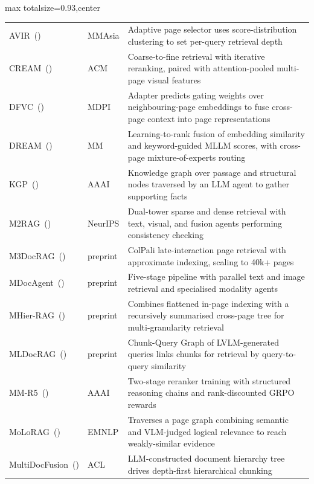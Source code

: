 \begin{table}[p]
\begin{adjustbox}{max totalsize={\textwidth}{0.93\textheight},center}
\begin{tabular}{@{}l l >{\raggedright\arraybackslash}p{}@{}}
\rowcolor{sectionbg}
\multicolumn{3}{l}{\textbf{Retrieval-Augmented Pipelines}} \\
\midrule
  {AVIR}~(\citeyear{li2026avir}) & MMAsia & Adaptive page selector uses score-distribution clustering to set per-query retrieval depth \\
  {CREAM}~(\citeyear{zhang2024cream}) & ACM & Coarse-to-fine retrieval with iterative reranking, paired with attention-pooled multi-page visual features \\
  {DFVC}~(\citeyear{qian2026accurate}) & MDPI & Adapter predicts gating weights over neighbouring-page embeddings to fuse cross-page context into page representations \\
  {DREAM}~(\citeyear{zhang2025dream}) & MM & Learning-to-rank fusion of embedding similarity and keyword-guided MLLM scores, with cross-page mixture-of-experts routing \\
  {KGP}~(\citeyear{wang2024knowledge}) & AAAI & Knowledge graph over passage and structural nodes traversed by an LLM agent to gather supporting facts \\
  {M2RAG}~(\citeyear{duan2025m2rag}) & NeurIPS & Dual-tower sparse and dense retrieval with text, visual, and fusion agents performing consistency checking \\
  {M3DocRAG}~(\citeyear{cho2024m3docrag}) & preprint & ColPali late-interaction page retrieval with approximate indexing, scaling to 40k+ pages \\
  {MDocAgent}~(\citeyear{han2025mdocagent}) & preprint & Five-stage pipeline with parallel text and image retrieval and specialised modality agents \\
  {MHier-RAG}~(\citeyear{gong2026mhier}) & preprint & Combines flattened in-page indexing with a recursively summarised cross-page tree for multi-granularity retrieval \\
  {MLDocRAG}~(\citeyear{zhang2026mldocrag}) & preprint & Chunk-Query Graph of LVLM-generated queries links chunks for retrieval by query-to-query similarity \\
  {MM-R5}~(\citeyear{xu2025mm}) & AAAI & Two-stage reranker training with structured reasoning chains and rank-discounted GRPO rewards \\
  {MoLoRAG}~(\citeyear{wu2025molorag}) & EMNLP & Traverses a page graph combining semantic and VLM-judged logical relevance to reach weakly-similar evidence \\
  {MultiDocFusion}~(\citeyear{shin2026multidocfusion}) & ACL & LLM-constructed document hierarchy tree drives depth-first hierarchical chunking \\

\end{tabular}
\end{adjustbox}
\end{table}
